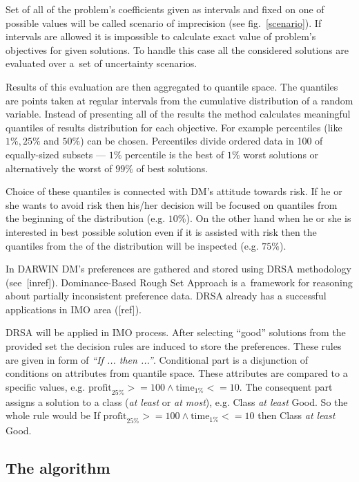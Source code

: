 Set of all of the problem's coefficients given as intervals and fixed on one
of possible values will be called scenario of imprecision (see
fig.~\ref{scenario}). If intervals are allowed it is impossible to calculate
exact value of problem's objectives for given solutions. To handle this case
all the considered solutions are evaluated over a~set of uncertainty
scenarios.

 Results of this evaluation are then aggregated to quantile space. The
 quantiles are points taken at regular intervals from the cumulative
 distribution of a random variable. Instead of presenting all of the results
 the method calculates meaningful quantiles of results distribution for each
 objective. For example percentiles (like $1\%, 25\%$ and $50\%$) can be
 chosen. Percentiles divide ordered data in 100 of equally-sized subsets ---
 $1\%$ percentile is the best of $1\%$ worst solutions or alternatively the
 worst of $99\%$ of best solutions.

Choice of these quantiles is connected with DM's attitude towards risk. If he
or she wants to avoid risk then his/her decision will be focused on quantiles
from the beginning of the distribution (e.g. $10\%$). On the other hand when
he or she is interested in best possible solution even if it is assisted with
risk then the quantiles from the of the distribution will be inspected
(e.g. $75\%$). 

In DARWIN DM's preferences are gathered and stored using DRSA methodology
(see~[inref]). Dominance-Based Rough Set Approach is a~framework for reasoning
about partially inconsistent preference data. DRSA already has a successful
applications in IMO area ([ref]).

DRSA will be applied in IMO process. After selecting ``good'' solutions
from the provided set the decision rules are induced to store the
preferences. These rules are given in form of \textit{``If ... then
  ...''}. Conditional part is a disjunction of conditions on attributes from
quantile space. These attributes are compared to a specific values, e.g.
$\text{profit}_{25\%} >= 100 \land \text{time}_{1\%} <= 10$. The consequent
part assigns a solution to a class (\textit{at least} or \textit{at most}),
e.g. Class \textit{at least} Good. So the whole rule would be If
$\text{profit}_{25\%} >= 100 \land \text{time}_{1\%} <= 10$ then Class
\textit{at least} Good.

\subsection{The algorithm}

